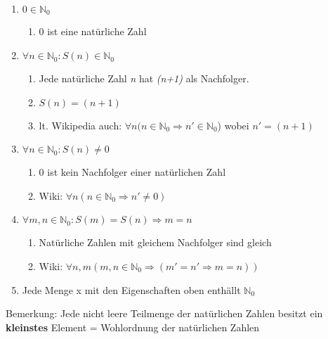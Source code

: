\documentclass[a4paper,12pt,ngerman,oneside]{article}
\begin{document}
  \begin{framed}
    \begin{enumerate}
      \item $0 \in \mathbb{N}_0$
      \begin{enumerate}
        \item 0 ist eine nat\"urliche Zahl
      \end{enumerate}

      \item $\forall n \in \mathbb{N}_0:S(n) \in \mathbb{N}_0$
      \begin{enumerate}
        \item Jede nat\"urliche Zahl \textit{n} hat \textit{(n+1)} als Nachfolger.
        \item $S(n) = (n+1)$
        \item lt. Wikipedia auch: $\forall n(n \in \mathbb{N}_0 \Rightarrow n'\in \mathbb{N}_0 $) wobei $n' = (n + 1)$
      \end{enumerate}

      \item $\forall n \in \mathbb{N}_0:S(n) \neq 0$
      \begin{enumerate}
        \item 0 ist kein Nachfolger einer nat\"urlichen Zahl
        \item Wiki: $\forall n(n\in \mathbb{N}_0 \Rightarrow n' \neq 0)$
      \end{enumerate}

      \item $\forall m,n \in \mathbb{N}_0:S(m)=S(n) \Rightarrow m=n$
      \begin{enumerate}
        \item Nat\"urliche Zahlen mit gleichem Nachfolger sind gleich
        \item Wiki: $\forall n,m(m,n \in \mathbb{N}_0 \Rightarrow (m' = n' \Rightarrow m = n)) $
      \end{enumerate}

      \item Jede Menge x mit den Eigenschaften oben enth\"allt $\mathbb{N}_0$
    \end{enumerate}
  \end{framed}
  Bemerkung: Jede nicht leere Teilmenge der nat\"urlichen Zahlen besitzt ein \textbf{kleinstes} Element = Wohlordnung der nat\"urlichen
  Zahlen 
\end{document}
